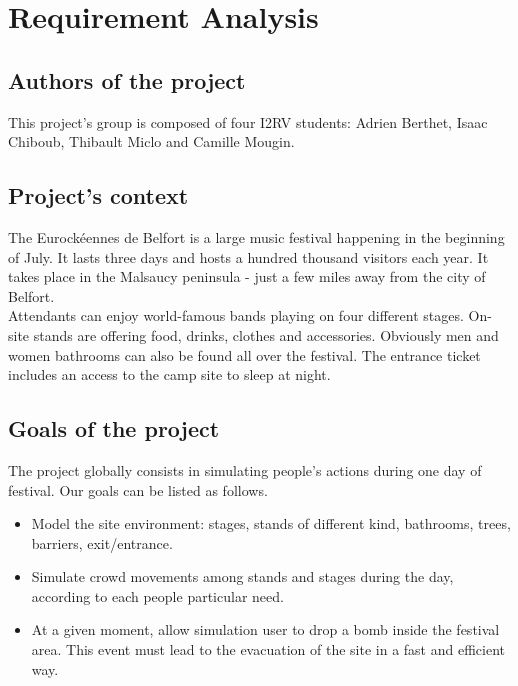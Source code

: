 \chapter{Requirement Analysis}

\section{Authors of the project}

This project's group is composed of four I2RV students: Adrien Berthet, Isaac 
Chiboub, Thibault Miclo and Camille Mougin.

\section{Project's context}

The Eurockéennes de Belfort is a large music festival happening in the beginning
of July. It lasts three days and hosts a hundred thousand visitors each year. It
takes place in the Malsaucy peninsula - just a few miles away from the city of
Belfort. \\

Attendants can enjoy world-famous bands playing on four different stages.
On-site stands are offering food, drinks, clothes and accessories. Obviously men
and women bathrooms can also be found all over the festival. The entrance ticket
includes an access to the camp site to sleep at night.

\section{Goals of the project}

The project globally consists in simulating people's actions during one day of
festival. Our goals can be listed as follows.\\

\begin{itemize}
	\item Model the site environment: stages, stands of different kind, 
	bathrooms, trees, barriers, exit/entrance.
	\item Simulate crowd movements among stands and stages during the day, 
	according to each people particular need.
	\item At a given moment, allow simulation user to drop a bomb inside the 
	festival area. This event must lead to the evacuation of the site in a fast 
	and efficient way.
\end{itemize}
